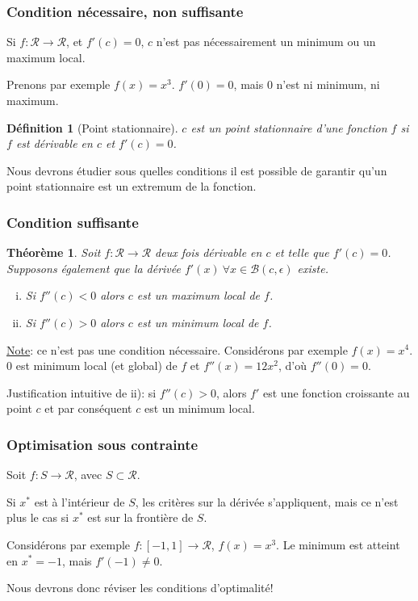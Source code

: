 \documentclass[usepdftitle=false]{beamer}
\newtheorem{defn}{Définition}
\newtheorem{thm}{Théorème}
\def\cB{\mathcal{B}}
\def\cR{\mathcal{R}}
\begin{document}
\begin{frame}
\frametitle{Condition nécessaire, non suffisante}

Si $f: \cR \rightarrow \cR$, et $f'(c) = 0$, $c$ n'est pas nécessairement un minimum ou un maximum local.

\mbox{}

Prenons par exemple $f(x) = x^3$. $f'(0) = 0$, mais $0$ n'est ni minimum, ni maximum.

\begin{defn}
	[Point stationnaire]
$c$ est un point stationnaire d'une fonction $f$ si $f$ est dérivable en $c$ et $f'(c) = 0$.
\end{defn}

\mbox{}

Nous devrons étudier sous quelles conditions il est possible de garantir qu'un point stationnaire est un extremum de la fonction.

\end{frame}

\begin{frame}
\frametitle{Condition suffisante}

\begin{thm}
Soit $f: \cR \rightarrow \cR$ deux fois dérivable en $c$ et telle que $f'(c) = 0$.
Supposons également que la dérivée $f'(x)\ \forall x \in \cB(c,\epsilon)$ existe.
\begin{enumerate}[i)]
	\item 
	Si $f''(c) < 0$ alors $c$ est un maximum local de $f$.
	\item
	Si $f''(c) > 0$ alors $c$ est un minimum local de $f$.
\end{enumerate}
\end{thm}

\mbox{}

\underline{Note}: ce n'est pas une condition nécessaire. Considérons par exemple $f(x) = x^4$. 0 est minimum local (et global) de $f$ et $f''(x) = 12x^2$, d'où $f''(0) = 0$.

\mbox{}

Justification intuitive de ii): si $f''(c)>0$, alors $f'$ est une fonction croissante au point $c$ et par conséquent $c$ est un minimum local.

\end{frame}

\begin{frame}
\frametitle{Optimisation sous contrainte}
	
Soit $f: S \rightarrow \cR$, avec $S \subset \cR$.

\mbox{}

Si $x^*$ est à l'intérieur de $S$, les critères sur la dérivée s'appliquent, mais ce n'est plus le cas si $x^*$ est sur la frontière de $S$.

\mbox{}

Considérons par exemple $f: [-1,1] \rightarrow \cR$, $f(x) = x^3$. Le minimum est atteint en $x^* = -1$, mais $f'(-1) \ne 0$.

\mbox{}

Nous devrons donc réviser les conditions d'optimalité!

\end{frame}
\end{document}
